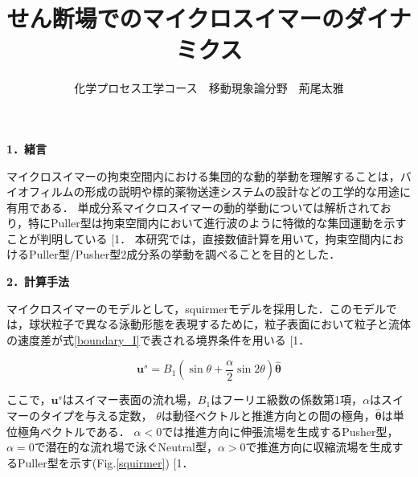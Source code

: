 \documentclass[twocolumns,10pt,a4j]{jarticle}
\title{\Large せん断場でのマイクロスイマーのダイナミクス\vspace{-3truemm}}
\author{\large 化学プロセス工学コース　移動現象論分野　荊尾太雅\vspace{-10zh}}
\date{}
\makeatletter
\DeclareRobustCommand\cite{\unskip
  \@ifnextchar[{\@tempswatrue\@citex}{\@tempswafalse\@citex[]}}
\makeatother
\begin{document}



  \noindent
  {\bf \large 1．緒言}
  \par
マイクロスイマーの拘束空間内における集団的な動的挙動を理解することは，バイオフィルムの形成の説明や標的薬物送達システムの設計などの工学的な用途に有用である．
単成分系マイクロスイマーの動的挙動については解析されており，特にPuller型は拘束空間内において進行波のように特徴的な集団運動を示すことが判明している\cite{1}．
本研究では，直接数値計算を用いて，拘束空間内におけるPuller型/Pusher型2成分系の挙動を調べることを目的とした．


  \noindent
  {\bf \large 2．計算手法}
  \par
マイクロスイマーのモデルとして，squirmerモデルを採用した．このモデルでは，球状粒子で異なる泳動形態を表現するために，粒子表面において粒子と流体の速度差が式\eqref{boundary_I}で表される境界条件を用いる\cite{1}．

  \vspace{-3truemm}
    \begin{equation}
      \boldsymbol{u}^s = B_1\left(\sin{\theta} + \frac{\alpha}{2}\sin{2\theta}\right)\hat{\boldsymbol{\theta}}
      \label{boundary_I}
    \end{equation}
  \vspace{-4truemm}

  \noindent
ここで，$\boldsymbol{u}^s$はスイマー表面の流れ場，$B_1$はフーリエ級数の係数第1項，$\alpha$はスイマーのタイプを与える定数，
$\theta$は動径ベクトルと推進方向との間の極角，$\hat{\boldsymbol{\theta}}$は単位極角ベクトルである．
$\alpha<0$では推進方向に伸張流場を生成するPusher型，$\alpha=0$で潜在的な流れ場で泳ぐNeutral型，$\alpha>0$で推進方向に収縮流場を生成するPuller型を示す(Fig.\ref{squirmer})\cite{1}．
\end{document}
